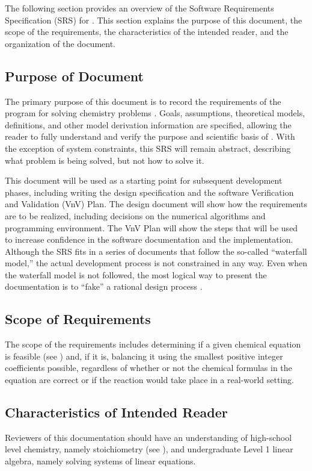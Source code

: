 \documentclass[12pt]{article}
\begin{document}
The following section provides an overview of the Software Requirements
Specification (SRS) for \progname{}. This section explains the purpose of this
document, the scope of the requirements, the characteristics of the intended
reader, and the organization of the document.

\subsection{Purpose of Document}

The primary purpose of this document is to record the requirements of the
program for solving chemistry problems .
Goals, assumptions, theoretical models,
definitions, and other model derivation information are specified, allowing the
reader to fully understand and verify the purpose and scientific basis of
\progname{}. With the exception of system constraints, this SRS will remain
abstract, describing what problem is being solved, but not how to solve it.

This document will be used as a starting point for subsequent development
phases, including writing the design specification and the software Verification
and Validation (VnV) Plan. The design document will show how the requirements
are to be realized, including decisions on the numerical algorithms and
programming environment. The VnV Plan will show the steps that will be used to
increase confidence in the software documentation and the implementation.
Although the SRS fits in a series of documents that follow the so-called
``waterfall model,'' the actual development process is not constrained in any
way. Even when the waterfall model is not followed, the most logical way to
present the documentation is to ``fake'' a rational design process
\cite{ParnasAndClements1986}.

\subsection{Scope of Requirements} \label{sec_scope}

The scope of the requirements includes determining if a given chemical equation
is feasible (see ) and, if it is, balancing it using the
smallest positive integer coefficients possible, regardless of whether or not the
chemical formulas in the equation are correct or if the reaction would take
place in a real-world setting.

\subsection{Characteristics of Intended Reader} \label{sec_IntendedReader}
Reviewers of this documentation should have an understanding of high-school level
chemistry, namely stoichiometry (see ), and undergraduate
Level 1 linear algebra, namely solving systems of linear equations.
\end{document}
